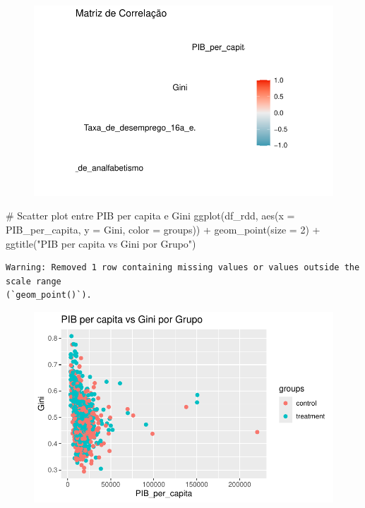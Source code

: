 \documentclass[
  letterpaper,
  DIV=11,
  numbers=noendperiod]{scrartcl}
\newenvironment{Shaded}{\begin{snugshade}}{\end{snugshade}}
\newcommand{\AttributeTok}[1]{\textcolor[rgb]{0.40,0.45,0.13}{#1}}
\newcommand{\CommentTok}[1]{\textcolor[rgb]{0.37,0.37,0.37}{#1}}
\newcommand{\DecValTok}[1]{\textcolor[rgb]{0.68,0.00,0.00}{#1}}
\newcommand{\FunctionTok}[1]{\textcolor[rgb]{0.28,0.35,0.67}{#1}}
\newcommand{\NormalTok}[1]{\textcolor[rgb]{0.00,0.23,0.31}{#1}}
\newcommand{\SpecialCharTok}[1]{\textcolor[rgb]{0.37,0.37,0.37}{#1}}
\newcommand{\StringTok}[1]{\textcolor[rgb]{0.13,0.47,0.30}{#1}}
\begin{document}
\begin{figure}[H]

{\centering \includegraphics{maps_files/figure-pdf/unnamed-chunk-17-2.pdf}

}

\end{figure}

\begin{Shaded}
\begin{Highlighting}[]
\CommentTok{\# Scatter plot entre PIB per capita e Gini}
\FunctionTok{ggplot}\NormalTok{(df\_rdd, }\FunctionTok{aes}\NormalTok{(}\AttributeTok{x =}\NormalTok{ PIB\_per\_capita, }\AttributeTok{y =}\NormalTok{ Gini, }\AttributeTok{color =}\NormalTok{ groups)) }\SpecialCharTok{+}
  \FunctionTok{geom\_point}\NormalTok{(}\AttributeTok{size =} \DecValTok{2}\NormalTok{) }\SpecialCharTok{+}
  \FunctionTok{ggtitle}\NormalTok{(}\StringTok{"PIB per capita vs Gini por Grupo"}\NormalTok{)}
\end{Highlighting}
\end{Shaded}

\begin{verbatim}
Warning: Removed 1 row containing missing values or values outside the scale range
(`geom_point()`).
\end{verbatim}

\begin{figure}[H]

{\centering \includegraphics{maps_files/figure-pdf/unnamed-chunk-18-1.pdf}

}

\end{figure}
\end{document}
